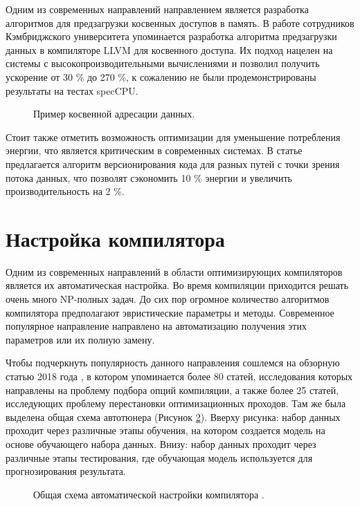 Одним из современных направлений направлением является разработка алгоритмов для предзагрузки косвенных доступов в память. В работе сотрудников Кэмбриджского университета \cite{purkayastha2020llvm}  упоминается разработка алгоритма предзагрузки данных в компиляторе LLVM для косвенного доступа. Их подход нацелен на  системы с высокопроизводительными вычислениями и позволил получить ускорение от 30 \% до 270 \%, к сожалению не были продемонстрированы результаты на тестах specCPU.
 \begin{figure}[htbp]
	\centering
	
	\caption{Пример косвенной адресации данных.}
	\label{partReview:prefetch3}
\end{figure}
Стоит также отметить возможность оптимизации для уменьшение потребления энергии, что является критическим в современных системах. В статье \cite{ekemark2016static} предлагается алгоритм версионирования кода для разных путей с точки зрения потока данных, что позволят сэкономить 10 \% энергии и увеличить производительность на 2 \%.

 
\section{Настройка компилятора} \label{pr:tuning}

Одним из современных направлений в области оптимизирующих компиляторов является их автоматическая настройка. Во время компиляции приходится решать очень много NP-полных задач. До сих пор огромное количество алгоритмов компилятора предполагают эвристические параметры и методы. Современное популярное направление направлено на автоматизацию получения этих параметров или их полную замену\cite{leather2020machine}.

Чтобы подчеркнуть популярность данного направления сошлемся на обзорную статью 2018 года \cite{ashouri2018survey}, в котором упоминается более 80 статей, исследования которых направлены на проблему подбора опций компиляции, а также более 25 статей, исследующих проблему перестановки оптимизационных проходов. Там же была выделена общая схема автотюнера (Рисунок \ref{partReview:ml_for_comp1}). Вверху рисунка: набор данных проходит через различные этапы обучения, на котором создается модель на основе обучающего набора данных. Внизу: набор данных проходит через различные этапы тестирования, где обучающая модель используется для прогнозирования результата.  

 \begin{figure}[htbp]
	\centering
	
	\caption{Общая схема автоматической настройки компилятора \cite{ashouri2018survey}.}
	\label{partReview:ml_for_comp1}
\end{figure}

